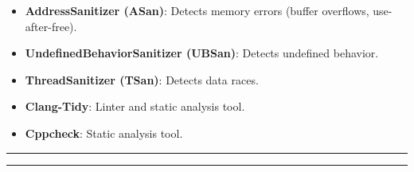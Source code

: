 \begin{itemize}
\tightlist
\item
  \textbf{AddressSanitizer (ASan)}: Detects memory errors (buffer
  overflows, use-after-free).
\item
  \textbf{UndefinedBehaviorSanitizer (UBSan)}: Detects undefined
  behavior.
\item
  \textbf{ThreadSanitizer (TSan)}: Detects data races.
\item
  \textbf{Clang-Tidy}: Linter and static analysis tool.
\item
  \textbf{Cppcheck}: Static analysis tool.
\end{itemize}

\begin{center}\rule{0.5\linewidth}{0.5pt}\end{center}

\begin{center}\rule{0.5\linewidth}{0.5pt}\end{center}

